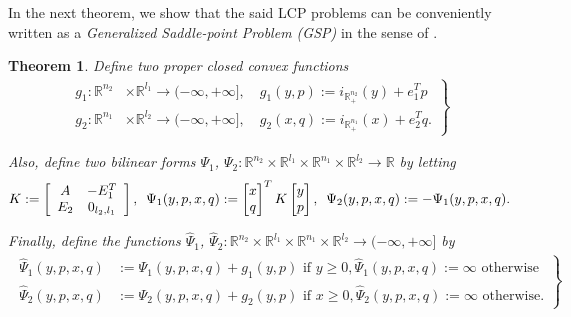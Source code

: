 \documentclass{article} %
\newtheorem{theorem}{Theorem} \newtheorem{lemma}[theorem]{Lemma}
\begin{document}
In the next theorem, we show that the said LCP problems can be
conveniently written as a \textit{Generalized Saddle-point Problem
  (GSP)} in the sense of \cite{he2013accelerating}.
\begin{theorem}
Define two proper closed convex functions
  \begin{eqnarray}
    \left.
    \begin{aligned}
      g_1: \mathbb{R}^{n_2} &\times \mathbb{R}^{l_1} \rightarrow
      (-\infty, +\infty], \hspace{1em} g_1(y, p) :=
        i_{\mathbb{R}^{n_2}_+}(y) + e_1^Tp\\
        g_2: \mathbb{R}^{n_1} &\times \mathbb{R}^{l_2} \rightarrow
        (-\infty, +\infty],\hspace{1em} g_2(x, q) :=
          i_{\mathbb{R}^{n_1}_+}(x) + e_2^Tq.
    \end{aligned}
    \right\}
    \label{eq:things}
  \end{eqnarray}

Also, define two bilinear forms $\Psi_1$, $\Psi_2: \mathbb{R}^{n_2}
\times \mathbb{R}^{l_1} \times \mathbb{R}^{n_1} \times
\mathbb{R}^{l_2} \rightarrow \mathbb{R}$ by letting
  \begin{equation}
      K :=
      \left[
        \begin{array}{cc}
          A & -E_1^T \\
          E_2 & 0_{l_2, l_1}
        \end{array}
        \right],\hspace{.5em}
    \Psi_1(y, p, x, q)
    := \begin{bmatrix}x\\q\end{bmatrix}^TK\begin{bmatrix}y\\p\end{bmatrix}, \hspace{.5em}
      \Psi_2(y, p, x, q) := -\Psi_1(y, p, x, q).
\end{equation}

Finally, define the functions $\hat{\Psi}_1$, $\hat{\Psi}_2:
\mathbb{R}^{n_2} \times \mathbb{R}^{l_1} \times \mathbb{R}^{n_1}
\times \mathbb{R}^{l_2} \rightarrow (-\infty, +\infty]$ by
\begin{eqnarray}
  \left.
  \begin{aligned}
    \hat{\Psi}_1(y, p, x, q) &:=
    \Psi_1(y, p, x, q)+ g_1(y, p) \text{ if }y \ge 0, \hat{\Psi}_1(y,
    p, x, q) := \infty \text{ otherwise}\\
    \hat{\Psi}_2(y, p, x, q) &:= \Psi_2(y, p, x, q)+ g_2(y, p) \text{ if
    }x \ge 0, \hat{\Psi}_2(y,p, x, q) := \infty \text{ otherwise}.
  \end{aligned}
  \right\}
\end{eqnarray}


\end{theorem}
\end{document}

